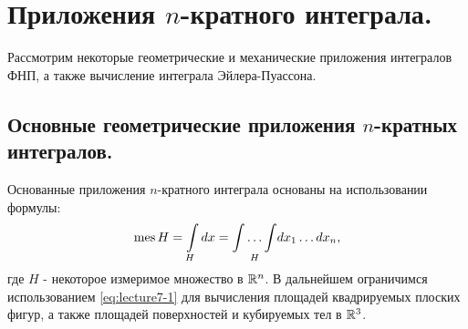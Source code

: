 \section{Приложения $n$-кратного интеграла.}
Рассмотрим некоторые геометрические и механические приложения интегралов ФНП,
а также вычисление интеграла Эйлера-Пуассона.

\subsection{Основные геометрические приложения $n$-кратных
интегралов.}
Основанные приложения $n$-кратного интеграла основаны на использовании формулы:
\begin{equation}
	\label{eq:lecture7-1}
	\operatorname{mes} H = \int\limits_Hdx = \underset{H}{\int \ldots \int}dx_1 \ldots dx_n,
\end{equation}
где $H$ - некоторое измеримое множество в $\mathbb{R}^{n}$. В дальнейшем ограничимся
использованием \eqref{eq:lecture7-1} для вычисления площадей квадрируемых плоских
фигур, а также площадей поверхностей и кубируемых тел в $\mathbb{R}^{3}$.
